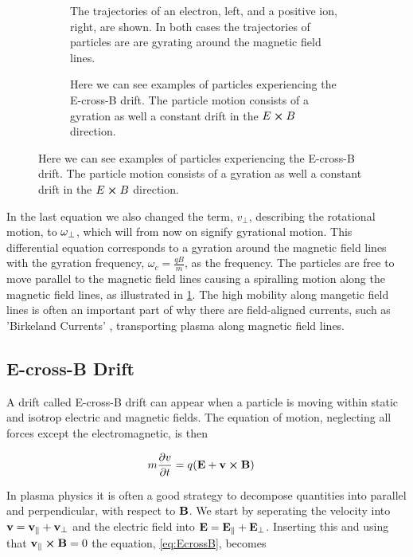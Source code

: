 		\begin{figure}
			\centering
			\begin{subfigure}{0.45\textwidth}
				
				\caption{The trajectories of an electron, left, and a positive ion, right, are shown.
					In both cases the trajectories of particles are are gyrating around the magnetic field lines.
				  }
				\label{fig:gyration}
			\end{subfigure}
			\begin{subfigure}{0.45\textwidth}
				
				\caption{Here we can see examples of particles experiencing the E-cross-B drift. The particle motion consists of a gyration
				as well a constant drift in the \(E\cross B\) direction.}
				\label{fig:EcrossB}
			\end{subfigure}
		\end{figure}

		In the last equation we also changed the term, \(v_\perp\), describing the rotational motion,
		to \(\vb{\omega}_\perp\), which will from now on signify gyrational motion.
		This differential equation corresponds to a gyration around the magnetic field lines
		with the gyration frequency, \(\omega_c = \frac{qB}{m}\), as the frequency. The particles are free to
		move parallel to the magnetic field lines causing a spiralling motion along the magnetic field lines, as illustrated in
		\cref{fig:gyration}. The high mobility along mangetic field lines is often an important part of why
		there are field-aligned currents, such as 'Birkeland Currents' \citep{cummings_field-aligned_1967},
		transporting plasma along magnetic field lines.

	\subsection{E-cross-B Drift}
	A drift called E-cross-B drift can appear when a particle is moving within static and isotrop
	electric and magnetic fields. The equation of motion, neglecting all forces
	except the electromagnetic, is then

	\begin{align}
		m\pdv{v}{t} &= q(\vb{E} + \vb{v}\cross\vb{B}) \label{eq:EcrossB}
	\end{align}

	In plasma physics it is often a good strategy to decompose quantities into
	parallel and perpendicular, with respect to \(\vb{B}\). We start by seperating the
	velocity into \(\vb{v} = \vb{v}_\parallel + \vb{v}_\perp\) and the electric field
	into \(\vb{E} = \vb{E}_\parallel + \vb{E}_\perp\). Inserting this and using that \(\vb{v}_\parallel\cross\vb{B}=0\)
	the equation, \cref{eq:EcrossB}, becomes

